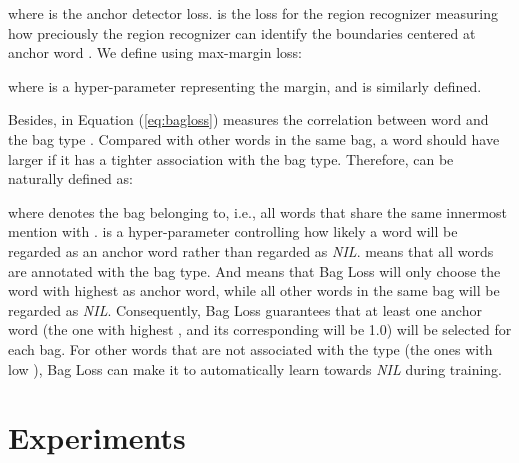 \documentclass[11pt,a4paper]{article}
\begin{document}
\begin{small}

\end{small}where  is the anchor detector loss.  is the loss for the region recognizer measuring how preciously the region recognizer can identify the boundaries centered at anchor word . We define  using max-margin loss:


\begin{small}

\end{small}where  is a hyper-parameter representing the margin, and  is similarly defined.

Besides,  in Equation (\ref{eq:bagloss}) measures the correlation between word  and the bag type . Compared with other words in the same bag, a word  should have larger  if it has a tighter association with the bag type. Therefore,  can be naturally defined as:

\begin{small}

\end{small}where  denotes the bag  belonging to, i.e., all words that share the same innermost mention with .  is a hyper-parameter controlling how likely a word will be regarded as an anchor word rather than regarded as \emph{NIL}.  means that all words are annotated with the bag type. And  means that Bag Loss will only choose the word with highest  as anchor word, while all other words in the same bag will be regarded as \emph{NIL}. Consequently, Bag Loss guarantees that at least one anchor word (the one with highest , and its corresponding  will be 1.0) will be selected for each bag. For other words that are not associated with the type (the ones with low ), Bag Loss can make it to automatically learn towards \emph{NIL} during training. 



\section{Experiments}
\end{document}
